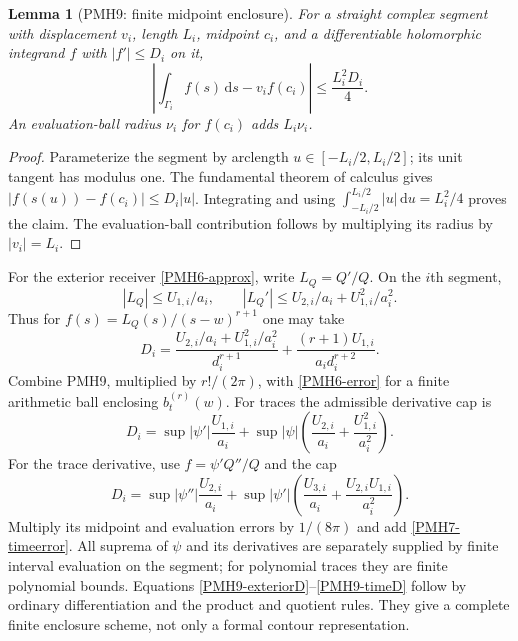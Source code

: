 \documentclass[11pt]{article}
\newtheorem{lemma}[theorem]{Lemma}
\newcommand{\dd}{\,\mathrm d}
\begin{document}
\begin{lemma}[PMH9: finite midpoint enclosure]
\label{PMH9}
For a straight complex segment with displacement $v_i$, length
$L_i$, midpoint $c_i$, and a differentiable holomorphic integrand
$f$ with $|f'|\le D_i$ on it,
\begin{equation}\label{PMH9-midpoint}
 \left|\int_{\Gamma_i}f(s)\dd s-v_if(c_i)\right|
 \le\frac{L_i^2D_i}{4}.
\end{equation}
An evaluation-ball radius $\nu_i$ for $f(c_i)$ adds $L_i\nu_i$.
\end{lemma}
\begin{proof}
Parameterize the segment by arclength $u\in[-L_i/2,L_i/2]$;
its unit tangent has modulus one. The fundamental theorem of
calculus gives $|f(s(u))-f(c_i)|\le D_i|u|$.
Integrating and using
$\int_{-L_i/2}^{L_i/2}|u|\dd u=L_i^2/4$ proves the claim.
The evaluation-ball contribution follows by multiplying its radius
by $|v_i|=L_i$.
\end{proof}

For the exterior receiver \eqref{PMH6-approx}, write
$L_Q=Q'/Q$. On the $i$th segment,
\[
 |L_Q|\le U_{1,i}/a_i,\qquad
 |L_Q'|\le U_{2,i}/a_i+U_{1,i}^2/a_i^2.
\]
Thus for $f(s)=L_Q(s)/(s-w)^{r+1}$ one may take
\begin{equation}\label{PMH9-exteriorD}
 D_i=\frac{U_{2,i}/a_i+U_{1,i}^2/a_i^2}{d_i^{r+1}}
       +\frac{(r+1)U_{1,i}}{a_i d_i^{r+2}}.
\end{equation}
Combine PMH9, multiplied by $r!/(2\pi)$, with
\eqref{PMH6-error} for a finite arithmetic ball enclosing
$b_t^{(r)}(w)$. For traces the admissible derivative cap is
\begin{equation}\label{PMH9-traceD}
 D_i=\sup|\psi'|\frac{U_{1,i}}{a_i}
 +\sup|\psi|\left(\frac{U_{2,i}}{a_i}
                         +\frac{U_{1,i}^2}{a_i^2}\right).
\end{equation}
For the trace derivative, use $f=\psi'Q''/Q$ and the cap
\begin{equation}\label{PMH9-timeD}
 D_i=\sup|\psi''|\frac{U_{2,i}}{a_i}
 +\sup|\psi'|\left(\frac{U_{3,i}}{a_i}
                         +\frac{U_{2,i}U_{1,i}}{a_i^2}\right).
\end{equation}
Multiply its midpoint and evaluation errors by $1/(8\pi)$ and add
\eqref{PMH7-timeerror}. All suprema of $\psi$ and its derivatives
are separately supplied by finite interval evaluation on the
segment; for polynomial traces they are finite polynomial bounds.
Equations \eqref{PMH9-exteriorD}--\eqref{PMH9-timeD} follow by
ordinary differentiation and the product and quotient rules. They
give a complete finite enclosure scheme, not only a formal contour
representation.
\end{document}
